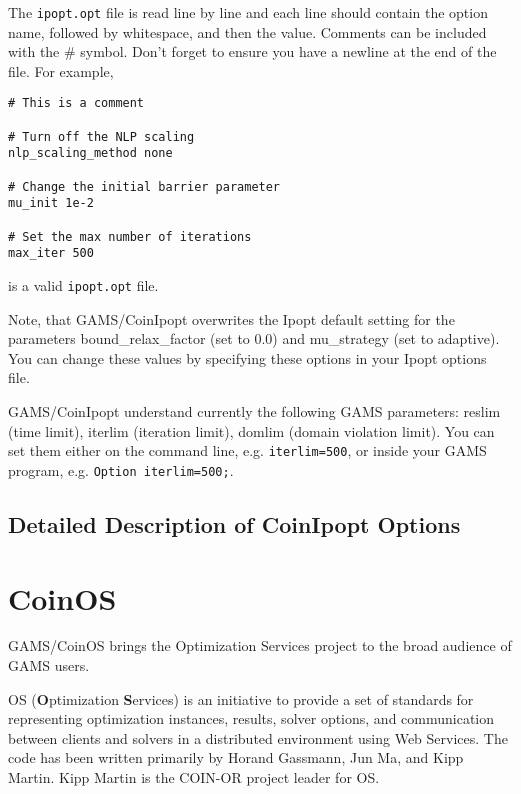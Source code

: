 The \texttt{ipopt.opt} file is read line by line and each line should contain the option name, followed by whitespace, and then the value.
Comments can be included with the \# symbol. Don't forget to ensure you have a newline at the end of the file. For example,
\begin{verbatim}
# This is a comment

# Turn off the NLP scaling
nlp_scaling_method none

# Change the initial barrier parameter
mu_init 1e-2

# Set the max number of iterations
max_iter 500
\end{verbatim}
is a valid \texttt{ipopt.opt} file.


Note, that GAMS/CoinIpopt overwrites the Ipopt default setting for the parameters bound\_relax\_factor (set to 0.0) and mu\_strategy (set to adaptive).
You can change these values by specifying these options in your Ipopt options file.

GAMS/CoinIpopt understand currently the following GAMS parameters: reslim (time limit), iterlim (iteration limit), domlim (domain violation limit).
You can set them either on the command line, e.g. \verb+iterlim=500+, or inside your GAMS program, e.g. \verb+Option iterlim=500;+.

\subsection{Detailed Description of CoinIpopt Options}
\label{sub:ipoptoptions}


\section{CoinOS}

GAMS/CoinOS brings the Optimization Services project to the broad audience of GAMS users.

OS (\textbf{O}ptimization \textbf{S}ervices) is an initiative to provide a set of standards for representing optimization instances, results, solver options, and communication between clients and solvers in a distributed environment using Web Services.
The code has been written primarily by Horand Gassmann, Jun Ma, and Kipp Martin.
Kipp Martin is the COIN-OR project leader for OS.

